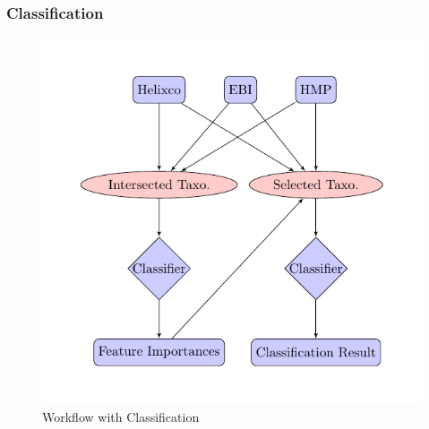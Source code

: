 \documentclass{beamer}
\begin{document}
    \begin{frame}[allowframebreaks]
        \frametitle{Classification}

        \begin{figure}[h!]
            \includegraphics[width=0.5 \linewidth]{figures/tikz/classification.pdf}
            \caption{Workflow with Classification}
        \end{figure}
    \end{frame}
\end{document}
